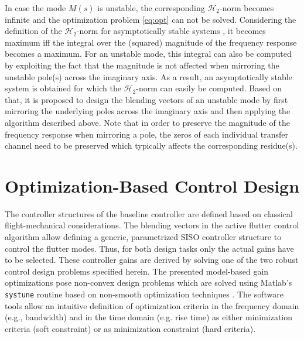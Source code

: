 \documentclass[aerospace,article,submit,moreauthors,pdftex,10pt,a4paper]{Definitions/mdpi}
\begin{document}
In case the mode $M(s)$ is unstable, the corresponding $\mathcal{H}_2$-norm becomes infinite and the optimization problem \eqref{eq:opt} can not be solved. Considering the definition of the $\mathcal{H}_2$-norm for asymptotically stable systems \cite{Skoge_05}, it becomes maximum iff the integral over the (squared) magnitude of the frequency response becomes a maximum. For an unstable mode, this integral can also be computed by exploiting the fact that  the magnitude is not affected when mirroring the unstable pole(s) across the imaginary axis. As a result, an asymptotically stable system is obtained for which the $\mathcal{H}_2$-norm can easily be computed. 
Based on that, it is proposed to design the blending vectors of an unstable mode by first mirroring the underlying poles across the imaginary axis and then applying the algorithm described above. Note that in order to preserve the magnitude of the frequency response when mirroring a pole, the zeros of each individual transfer channel need to be preserved which typically affects the corresponding residue(s).






\section{Optimization-Based Control Design}\label{sec:opt}
The controller structures of the baseline controller are defined based on classical flight-mechanical considerations. The blending vectors in the active flutter control algorithm allow defining a generic, parametrized SISO controller structure to control the flutter modes. Thus, for both design tasks only the actual gains have to be selected. 
These controller gains are derived by solving one of the two  robust control design problems specified herein. The presented  model-based gain optimizations pose non-convex design problems which are solved  using Matlab's \texttt{systune} routine based on non-smooth optimization techniques \cite{Apkarian06}.
The software tools allow an intuitive definition of optimization criteria  in the frequency domain (e.g., bandwidth) and in the time domain (e.g. rise time)  as either minimization criteria (soft constraint) or as minimization constraint (hard criteria). 
\end{document}
